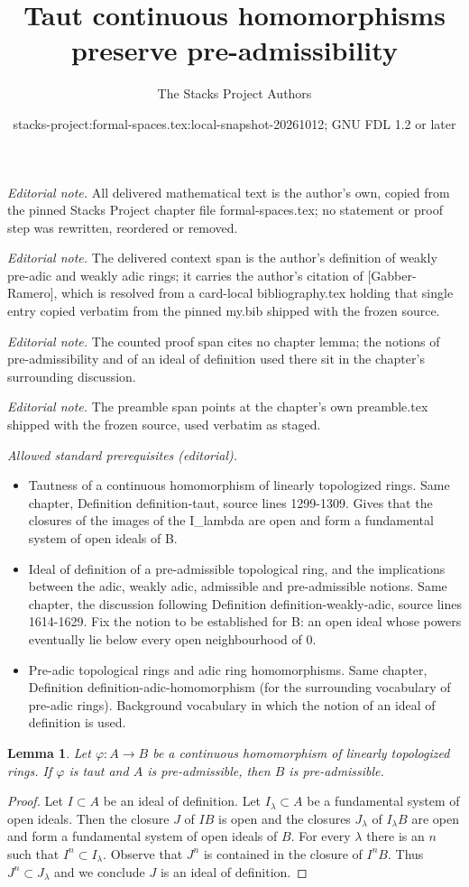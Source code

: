 \documentclass{stacks-project}
\title{Taut continuous homomorphisms preserve pre-admissibility}
\author{The Stacks Project Authors}
\date{stacks-project:formal-spaces.tex:local-snapshot-20261012; GNU FDL 1.2 or later}
\theoremstyle{plain}
\newtheorem{lemma}[subsection]{Lemma}
\theoremstyle{definition}
\theoremstyle{remark}
\numberwithin{equation}{subsection}
\begin{document}
\maketitle
\noindent\textit{Editorial note.} All delivered mathematical text is the author's own, copied from the pinned Stacks Project chapter file formal-spaces.tex; no statement or proof step was rewritten, reordered or removed.\par\medskip
\noindent\textit{Editorial note.} The delivered context span is the author's definition of weakly pre-adic and weakly adic rings; it carries the author's citation of [Gabber-Ramero], which is resolved from a card-local bibliography.tex holding that single entry copied verbatim from the pinned my.bib shipped with the frozen source.\par\medskip
\noindent\textit{Editorial note.} The counted proof span cites no chapter lemma; the notions of pre-admissibility and of an ideal of definition used there sit in the chapter's surrounding discussion.\par\medskip
\noindent\textit{Editorial note.} The preamble span points at the chapter's own preamble.tex shipped with the frozen source, used verbatim as staged.\par\medskip
\noindent\textit{Allowed standard prerequisites (editorial).}\begin{itemize}
\item Tautness of a continuous homomorphism of linearly topologized rings. Same chapter, Definition definition-taut, source lines 1299-1309. Gives that the closures of the images of the I\_lambda are open and form a fundamental system of open ideals of B.
\item Ideal of definition of a pre-admissible topological ring, and the implications between the adic, weakly adic, admissible and pre-admissible notions. Same chapter, the discussion following Definition definition-weakly-adic, source lines 1614-1629. Fix the notion to be established for B: an open ideal whose powers eventually lie below every open neighbourhood of 0.
\item Pre-adic topological rings and adic ring homomorphisms. Same chapter, Definition definition-adic-homomorphism (for the surrounding vocabulary of pre-adic rings). Background vocabulary in which the notion of an ideal of definition is used.
\end{itemize}\medskip
\begin{lemma}
\label{lemma-taut-ascent-admissible}
Let $\varphi : A \to B$ be a continuous homomorphism of
linearly topologized rings. If $\varphi$ is taut and $A$
is pre-admissible, then $B$ is pre-admissible.
\end{lemma}

\begin{proof}
Let $I \subset A$ be an ideal of definition. Let
$I_\lambda \subset A$ be a fundamental system of open ideals.
Then the closure $J$ of $IB$ is open and the
closures $J_\lambda$ of $I_\lambda B$ are open and form a
fundamental system of open ideals of $B$.
For every $\lambda$ there is an $n$ such that $I^n \subset I_\lambda$.
Observe that $J^n$ is contained in the closure of $I^nB$.
Thus $J^n \subset J_\lambda$ and we conclude $J$ is an
ideal of definition.
\end{proof}
\end{document}
